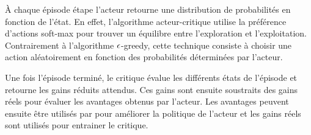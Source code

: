 À chaque épisode étape l'acteur retourne une distribution de probabilités en fonction de l'état.
En effet, l'algorithme acteur-critique utilise la préférence d'actions soft-max pour trouver un équilibre entre l'exploration et l'exploitation. 
Contrairement à l'algorithme $\large\epsilon$-greedy, cette technique consiste à choisir une action aléatoirement en fonction des probabilités déterminées par l'acteur. \cite{BartoSutton}

Une fois l'épisode terminé, le critique évalue les différents états de l'épisode et retourne les gains réduits attendus.
Ces gains sont ensuite soustraits des gains réels pour évaluer les avantages obtenus par l'acteur.
Les avantages peuvent ensuite être utilisés par pour améliorer la politique de l'acteur et les gains réels sont utilisés pour 
entrainer le critique.

